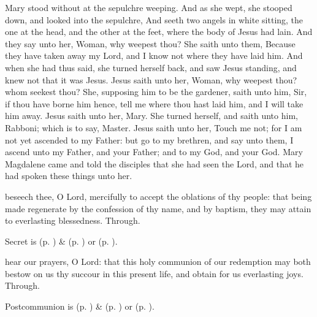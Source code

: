 \vspace{-0.4\baselineskip}

 Mary stood without at the sepulchre weeping. And as she wept, she stooped down, and looked into the sepulchre, And seeth two angels in white sitting, the one at the head, and the other at the feet, where the body of Jesus had lain. And they say unto her, Woman, why weepest thou? She saith unto them, Because they have taken away my Lord, and I know not where they have laid him. And when she had thus said, she turned herself back, and saw Jesus standing, and knew not that it was Jesus. Jesus saith unto her, Woman, why weepest thou? whom seekest thou? She, supposing him to be the gardener, saith unto him, Sir, if thou have borne him hence, tell me where thou hast laid him, and I will take him away. Jesus saith unto her, Mary. She turned herself, and saith unto him, Rabboni; which is to say, Master. Jesus saith unto her, Touch me not; for I am not yet ascended to my Father: but go to my brethren, and say unto them, I ascend unto my Father, and your Father; and to my God, and your God. Mary Magdalene came and told the disciples that she had seen the Lord, and that he had spoken these things unto her.


\vspace{-0.3\baselineskip}

\secret
{} beseech thee, O Lord, mercifully to accept the oblations of thy people: that being made regenerate by the confession of thy name, and by baptism, they may attain to everlasting blessedness. Through.
\begin{rubric}
     Secret is  (p. \pageref{EasterSecret}) \&   (p. \pageref{SPAgainst}) or  (p. \pageref{SPChiefBishop}).
\end{rubric}


\vspace{-0.3\baselineskip}

\postcommunion
{} hear our prayers, O Lord: that this holy communion of our redemption may both bestow on us thy succour in this present life, and obtain for us everlasting joys. Through.
\begin{rubric}
     Postcommunion is  (p. \pageref{EasterPostcommunion}) \&   (p. \pageref{SPAgainst}) or  (p. \pageref{SPChiefBishop}).
\end{rubric}


